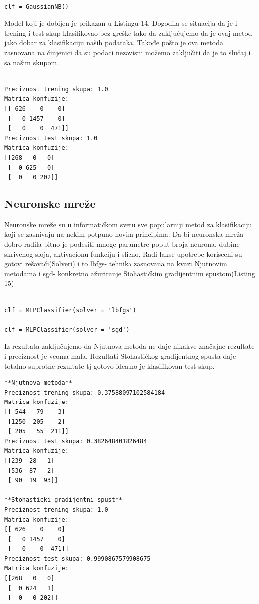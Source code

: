 \documentclass[14pt]{extarticle}
\begin{document}
\begin{lstlisting}[caption={Vizuelizacija},frame=single, label=simple]

clf = GaussianNB()

\end{lstlisting}
Model koji je dobijen je prikazan u Listingu 14. Dogodila se situacija da je i trening i test skup klasifikovao bez greške tako da zaključujemo da je ovaj metod jako dobar za klasifikaciju naših podataka. Takođe pošto je ova metoda zasnovana na činjenici da su podaci nezavisni možemo zaključiti da je to slučaj i sa našim skupom.

\begin{lstlisting}[caption={Vizuelizacija},frame=single, label=simple]

Preciznost trening skupa: 1.0
Matrica konfuzije:
[[ 626    0    0]
 [   0 1457    0]
 [   0    0  471]]
Preciznost test skupa: 1.0
Matrica konfuzije:
[[268   0   0]
 [  0 625   0]
 [  0   0 202]]

\end{lstlisting}
\subsection{Neuronske mreže}
\label{subsec:podnaslovM}
Neuronske mreže su u informatičkom svetu sve popularniji metod za klasifikaciju koji se zasnivaju na nekim potpuno novim principima. Da bi neuronska mreža dobro radila bitno je podesiti mnoge parametre poput broja neurona, dubine skrivenog sloja, aktivacionu funkciju i slicno. Radi lakse upotrebe korisceni su gotovi rešavači(Solveri) i to lbfgs- tehnika zasnovana na kvazi Njutnovim metodama i sgd- konkretno ažuriranje Stohastičkim gradijentnim spustom(Listing 15)

\begin{lstlisting}[caption={Vizuelizacija},frame=single, label=simple]

clf = MLPClassifier(solver = 'lbfgs')

clf = MLPClassifier(solver = 'sgd')

\end{lstlisting}
Iz rezultata zaključujemo da Njutnova metoda ne daje nikakve značajne rezultate i preciznost je veoma mala. Rezultati Stohastičkog gradijentnog spusta daje totalno suprotne rezultate tj gotovo idealno je klasifikovan test skup.
\begin{lstlisting}[caption={Vizuelizacija},frame=single, label=simple]
**Njutnova metoda**
Preciznost trening skupa: 0.37588097102584184
Matrica konfuzije:
[[ 544   79    3]
 [1250  205    2]
 [ 205   55  211]]
Preciznost test skupa: 0.382648401826484
Matrica konfuzije:
[[239  28   1]
 [536  87   2]
 [ 90  19  93]]
 
**Stohasticki gradijentni spust**
Preciznost trening skupa: 1.0
Matrica konfuzije:
[[ 626    0    0]
 [   0 1457    0]
 [   0    0  471]]
Preciznost test skupa: 0.9990867579908675
Matrica konfuzije:
[[268   0   0]
 [  0 624   1]
 [  0   0 202]]

\end{lstlisting}
\end{document}
